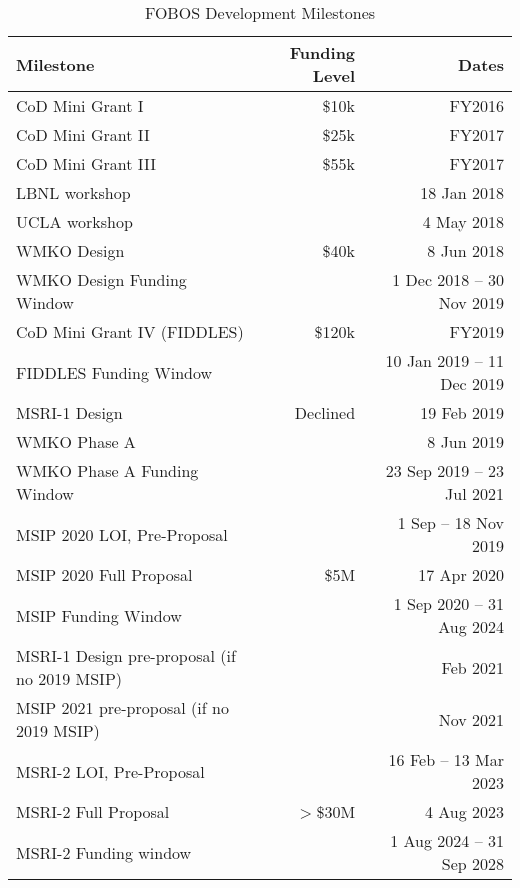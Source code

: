 \begin{table}[h!]
\centering
\footnotesize
\caption{FOBOS Development Milestones}
\label{tab:milestones}
\vspace*{-10pt}
\begin{tabular}{l r r}
Milestone                     & Funding Level & Dates \\
\hline
\hline
CoD Mini Grant I              &  \$10k & FY2016 \\
CoD Mini Grant II             &  \$25k & FY2017 \\
CoD Mini Grant III            &  \$55k & FY2017 \\
LBNL workshop                 &        & 18 Jan 2018 \\
UCLA workshop                 &        & 4 May 2018 \\
WMKO Design                   &  \$40k & 8 Jun 2018 \\
WMKO Design Funding Window    &        & 1 Dec 2018 -- 30 Nov 2019 \\
CoD Mini Grant IV (FIDDLES)   & \$120k & FY2019 \\
FIDDLES Funding Window        &        & 10 Jan 2019 -- 11 Dec 2019 \\
\hline
MSRI-1 Design               & Declined & 19 Feb 2019 \\
WMKO Phase A                  & \request{} & 8 Jun 2019 \\
WMKO Phase A Funding Window   &        & 23 Sep 2019 -- 23 Jul 2021 \\
\hline
MSIP 2020 LOI, Pre-Proposal   &        & 1 Sep -- 18 Nov 2019 \\
MSIP 2020 Full Proposal       &   \$5M & 17 Apr 2020 \\
MSIP Funding Window           &        & 1 Sep 2020 -- 31 Aug 2024 \\
\hline
MSRI-1 Design pre-proposal (if no 2019 MSIP)    &  & Feb 2021 \\
MSIP 2021 pre-proposal (if no 2019 MSIP)        &  & Nov 2021 \\
\hline
MSRI-2 LOI, Pre-Proposal      &        & 16 Feb -- 13 Mar 2023 \\
MSRI-2 Full Proposal          & $>$\$30M & 4 Aug 2023 \\
MSRI-2 Funding window         &        & 1 Aug 2024 -- 31 Sep 2028 \\
\hline
\end{tabular}
\end{table}

\newpage







